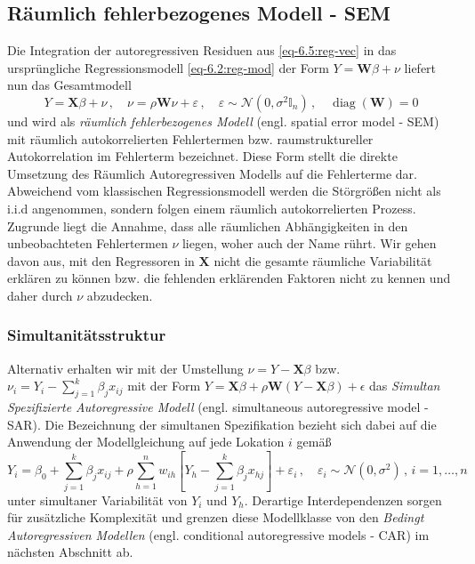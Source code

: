 \subsection{Räumlich fehlerbezogenes Modell - SEM}
Die Integration der autoregressiven Residuen aus \eqref{eq-6.5:reg-vec} in das ursprüngliche 
Regressionsmodell \eqref{eq-6.2:reg-mod} der Form $Y=\mathbf{W} \beta + \nu$ liefert nun das 
Gesamtmodell 
\begin{equation} \label{eq-6.7:sem-mod}
    Y=\mathbf{X} \beta + \nu \, , \quad \nu=\rho \mathbf{W} \nu + \varepsilon \, , \quad 
    \varepsilon \sim \mathcal{N}(0,\sigma^{2} \mathds{I}_{n}) \, , \quad 
    \operatorname{diag}(\mathbf{W})=0
\end{equation}
und wird als \emph{räumlich fehlerbezogenes Modell} 
(engl. spatial error model - SEM) mit räumlich autokorrelierten Fehlertermen bzw. 
raumstruktureller Autokorrelation im Fehlerterm bezeichnet. 
Diese Form stellt die direkte Umsetzung des Räumlich Autoregressiven Modells auf die Fehlerterme 
dar. Abweichend vom klassischen Regressionsmodell werden die Störgrößen nicht 
als i.i.d angenommen, sondern folgen einem räumlich autokorrelierten Prozess.
Zugrunde liegt die Annahme, dass alle räumlichen Abhängigkeiten in den 
unbeobachteten Fehlertermen $\nu$ liegen, woher auch der Name rührt. 
Wir gehen davon aus, mit den Regressoren in $\mathbf{X}$ nicht die gesamte 
räumliche Variabilität erklären zu können bzw. die fehlenden 
erklärenden Faktoren nicht zu kennen und daher durch $\nu$ abzudecken.

\subsubsection{Simultanitätsstruktur}

Alternativ erhalten wir mit der Umstellung $\nu=Y- \mathbf{X} \beta$ 
bzw. $\nu_{i}=Y_{i}-\sum_{j=1}^{k} \beta_{j} x_{ij}$ mit der 
Form $Y=\mathbf{X} \beta + \rho \mathbf{W} (Y-\mathbf{X} \beta) + \epsilon$ das \emph{Simultan Spezifizierte Autoregressive Modell} 
(engl. simultaneous autoregressive model -SAR). Die Bezeichnung 
der \glqq simultanen Spezifikation\grqq{} bezieht sich dabei auf die Anwendung der Modellgleichung auf 
jede Lokation $i$ gemäß
\begin{equation}
    Y_i = \beta_{0} + \sum_{j=1}^{k} 
    \beta_{j} x_{ij} + \rho \sum_{h=1}^{n} w_{ih} \left[ Y_{h}- \sum_{j=1}^{k} \beta_{j} x_{hj} \right] + \varepsilon_{i} \, , \quad
    \varepsilon_{i} \sim \mathcal{N}(0,\sigma^{2}) \, , \, i=1,\ldots,n
\end{equation}
unter simultaner Variabilität von $Y_{i}$ und $Y_{h}$. Derartige Interdependenzen sorgen für zusätzliche Komplexität 
und grenzen diese Modellklasse von den \emph{Bedingt Autoregressiven Modellen} 
(engl. conditional autoregressive models - CAR) im nächsten Abschnitt ab.

